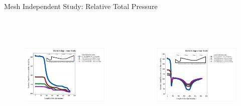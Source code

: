 \begin{frame}{Mesh Independent Study: Relative Total Pressure}
       \begin{columns}
      \begin{figure}[h]
      \centering
      \includegraphics[height=4.5cm]{images/MISRelTPAir.png}
      \label{fig:meshindependentstudy}
      \end{figure}
      \begin{figure}[h]
      \centering
      \includegraphics[height=4.5cm]{images/MISRTPsteam.png}
      \label{fig:meshindependentstudy}
      \end{figure}
    \end{columns}
\end{frame}

